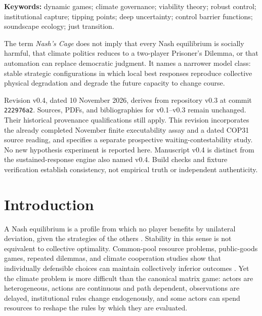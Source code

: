 \documentclass[11pt,a4paper]{article}
\numberwithin{equation}{section}
\theoremstyle{definition}
\theoremstyle{plain}
\theoremstyle{remark}
\begin{document}
\noindent\textbf{Keywords:} dynamic games; climate governance; viability theory; robust control; institutional capture; tipping points; deep uncertainty; control barrier functions; soundscape ecology; just transition.

\vspace{0.8em}
\begin{boundarybox}
The term \emph{Nash's Cage} does not imply that every Nash equilibrium is socially harmful, that climate politics reduces to a two-player Prisoner's Dilemma, or that automation can replace democratic judgment. It names a narrower model class: stable strategic configurations in which local best responses reproduce collective physical degradation and degrade the future capacity to change course.
\end{boundarybox}

\begin{provenancebox}
Revision v0.4, dated 10 November 2026, derives from repository v0.3 at commit \texttt{222976a2}. Sources, PDFs, and bibliographies for v0.1--v0.3 remain unchanged. Their historical provenance qualifications still apply. This revision incorporates the already completed November finite executability assay and a dated COP31 source reading, and specifies a separate prospective waiting-contestability study. No new hypothesis experiment is reported here. Manuscript v0.4 is distinct from the sustained-response engine also named v0.4. Build checks and fixture verification establish consistency, not empirical truth or independent authenticity.
\end{provenancebox}

{\small\tableofcontents}
\newpage

\section{Introduction}

A Nash equilibrium is a profile from which no player benefits by unilateral deviation, given the strategies of the others \citep{nash1950}. Stability in this sense is not equivalent to collective optimality. Common-pool resource problems, public-goods games, repeated dilemmas, and climate cooperation studies show that individually defensible choices can maintain collectively inferior outcomes \citep{hardin1968,axelrod1984,ostrom1990,milinski2008,nordhaus2015}. Yet the climate problem is more difficult than the canonical matrix game: actors are heterogeneous, actions are continuous and path dependent, observations are delayed, institutional rules change endogenously, and some actors can spend resources to reshape the rules by which they are evaluated.
\end{document}

